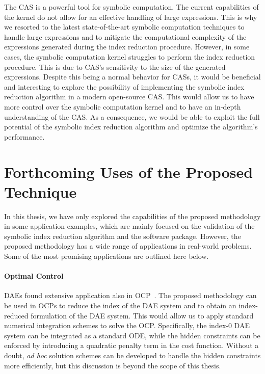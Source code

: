 The \Maple{} \ac{CAS} is a powerful tool for symbolic computation. The current capabilities of the \Maple{} kernel do not allow for an effective handling of large expressions. This is why we resorted to the latest state-of-the-art symbolic computation techniques to handle large expressions and to mitigate the computational complexity of the expressions generated during the index reduction procedure. However, in some cases, the \Maple{} symbolic computation kernel struggles to perform the index reduction procedure. This is due to \ac{CAS}'s sensitivity to the size of the generated expressions. Despite this being a normal behavior for \acp{CAS}, it would be beneficial and interesting to explore the possibility of implementing the symbolic index reduction algorithm in a modern open-source \ac{CAS}. This would allow us to have more control over the symbolic computation kernel and to have an in-depth understanding of the \ac{CAS}. As a consequence, we would be able to exploit the full potential of the symbolic index reduction algorithm and optimize the algorithm's performance.

\section{Forthcoming Uses of the Proposed Technique}

In this thesis, we have only explored the capabilities of the proposed methodology in some application examples, which are mainly focused on the validation of the symbolic index reduction algorithm and the \Indigo{} software package. However, the proposed methodology has a wide range of applications in real-world problems. Some of the most promising applications are outlined here below.

\paragraph{Optimal Control}

\acp{DAE} found extensive application also in \ac{OCP}~\cite{gerdts2012optimal, gerdts2003optimal, gerdts2005gradient}. The proposed methodology can be used in \acp{OCP} to reduce the index of the \ac{DAE} system and to obtain an index-reduced formulation of the \ac{DAE} system. This would allow us to apply standard numerical integration schemes to solve the \ac{OCP}. Specifically, the index-0 \ac{DAE} system can be integrated as a standard \ac{ODE}, while the hidden constraints can be enforced by introducing a quadratic penalty term in the cost function. Without a doubt, \emph{ad hoc} solution schemes can be developed to handle the hidden constraints more efficiently, but this discussion is beyond the scope of this thesis.

